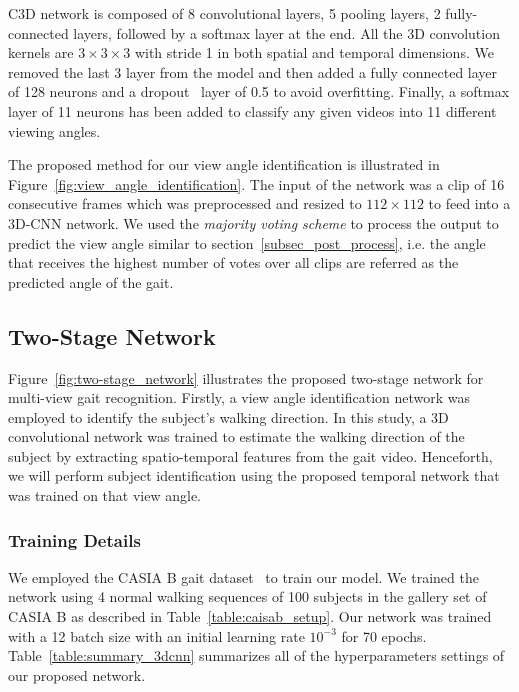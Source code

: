 C3D network is composed of 8 convolutional layers, 5 pooling layers, 2 fully-connected layers, followed by a softmax layer at the end. All the 3D convolution kernels are $3\times3\times3$ with stride 1 in both spatial and temporal dimensions. We removed the last 3 layer from the model and then added a fully connected layer of 128 neurons and a dropout~\cite{Srivastava_14} layer of 0.5 to avoid overfitting. Finally, a softmax layer of 11 neurons has been added to classify any given videos into 11 different viewing angles. 

The proposed method for our view angle identification is illustrated in Figure~\ref{fig:view_angle_identification}. The input of the network was a clip of 16 consecutive frames which was preprocessed and resized to $112\times112$ to feed into a  3D-CNN network. We used the {\textit {majority voting scheme}} to process the output to predict the view angle similar to section~\ref{subsec_post_process}, i.e. the angle that receives the highest number of votes over all clips are referred as the predicted angle of the gait.



\subsection{Two-Stage Network}
Figure~\ref{fig:two-stage_network} illustrates the proposed two-stage network for multi-view gait recognition. Firstly, a view angle identification network was employed to identify the subject's walking direction. In this study, a 3D convolutional network was trained to estimate the walking direction of the subject by extracting spatio-temporal features from the gait video. Henceforth, we will perform subject identification using the proposed temporal network that was trained on that view angle.


\subsubsection{Training Details}
We employed the CASIA B gait dataset~\cite{Yu_06} to train our model. We trained the network using 4 normal walking sequences of 100 subjects in the gallery set of CASIA B as described in Table~\ref{table:caisab_setup}. Our network was trained with a 12 batch size with an initial learning rate ${10^{-3}}$ for 70 epochs. Table~\ref{table:summary_3dcnn} summarizes all of the hyperparameters settings of our proposed network.

